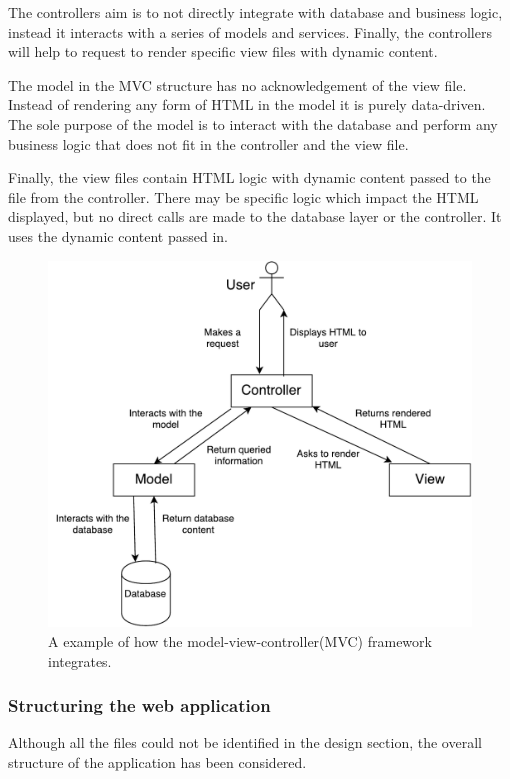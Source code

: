 The controllers aim is to not directly integrate with database and business logic, instead it interacts with a series of models and services. Finally, the controllers will help to request to render specific view files with dynamic content.

The model in the MVC structure has no acknowledgement of the view file. Instead of rendering any form of HTML in the model it is purely data-driven. The sole purpose of the model is to interact with the database and perform any business logic that does not fit in the controller and the view file.

Finally, the view files contain HTML logic with dynamic content passed to the file from the controller. There may be specific logic which impact the HTML displayed, but no direct calls are made to the database layer or the controller. It uses the dynamic content passed in.

\begin{figure}[H]
  \centering
  \includegraphics[scale=0.4]{images/MVC}
  \caption{A example of how the model-view-controller(MVC) framework integrates.}
  \label{fig:mvc}
\end{figure}

\subsubsection{Structuring the web application}
Although all the files could not be identified in the design section, the overall structure of the application has been considered.

